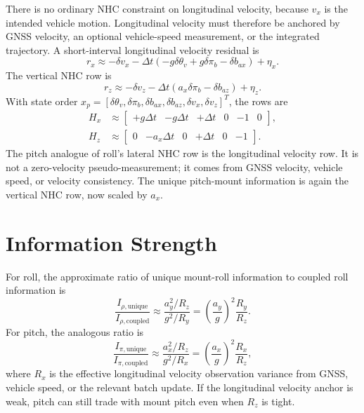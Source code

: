 \documentclass[11pt]{article}
\newcommand{\T}{^{T}}
\newcommand{\dt}{\Delta t}
\newcommand{\thetav}{\delta\theta_v}
\newcommand{\pim}{\delta\pi_b}
\begin{document}
There is no ordinary NHC constraint on longitudinal velocity, because \(v_x\)
is the intended vehicle motion. Longitudinal velocity must therefore be
anchored by GNSS velocity, an optional vehicle-speed measurement, or the
integrated trajectory. A short-interval longitudinal velocity residual is
\begin{equation}
  r_x \approx
    -\delta v_x-\dt(-g\thetav+g\pim-\delta b_{ax})+\eta_x.
\end{equation}
The vertical NHC row is
\begin{equation}
  r_z \approx
    -\delta v_z-\dt(a_x\pim-\delta b_{az})+\eta_z.
\end{equation}
With state order \(x_p=[\thetav,\pim,\delta b_{ax},\delta b_{az},
\delta v_x,\delta v_z]\T\), the rows are
\begin{align}
  H_x &\approx
    \begin{bmatrix}
    +g\dt & -g\dt & +\dt & 0 & -1 & 0
    \end{bmatrix},\\
  H_z &\approx
    \begin{bmatrix}
    0 & -a_x\dt & 0 & +\dt & 0 & -1
    \end{bmatrix}.
\end{align}
The pitch analogue of roll's lateral NHC row is the longitudinal velocity row.
It is not a zero-velocity pseudo-measurement; it comes from GNSS velocity,
vehicle speed, or velocity consistency. The unique pitch-mount information is
again the vertical NHC row, now scaled by \(a_x\).

\section{Information Strength}

For roll, the approximate ratio of unique mount-roll information to coupled
roll information is
\begin{equation}
  \frac{I_{\rho,\text{unique}}}{I_{\rho,\text{coupled}}}
  \approx
  \frac{a_y^2/R_z}{g^2/R_y}
  =
  \left(\frac{a_y}{g}\right)^2\frac{R_y}{R_z}.
  \label{eq:roll-ratio}
\end{equation}
For pitch, the analogous ratio is
\begin{equation}
  \frac{I_{\pi,\text{unique}}}{I_{\pi,\text{coupled}}}
  \approx
  \frac{a_x^2/R_z}{g^2/R_x}
  =
  \left(\frac{a_x}{g}\right)^2\frac{R_x}{R_z},
  \label{eq:pitch-ratio}
\end{equation}
where \(R_x\) is the effective longitudinal velocity observation variance from
GNSS, vehicle speed, or the relevant batch update. If the longitudinal velocity
anchor is weak, pitch can still trade with mount pitch even when \(R_z\) is
tight.
\end{document}
